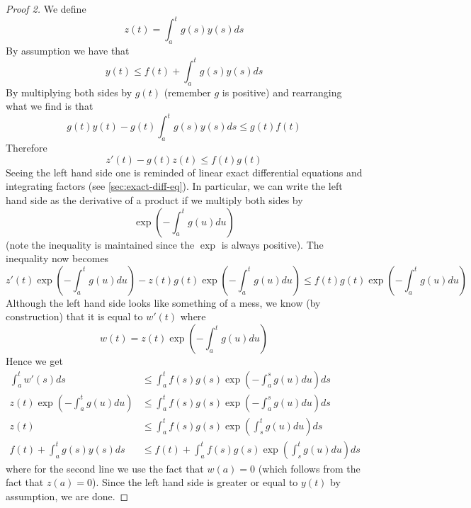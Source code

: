 \begin{proof}[Proof 2]
    We define
    $$ z(t) = \int_a^t g(s) y(s) ds $$
    By assumption we have that
    $$ y(t) \leq f(t) + \int_a^t g(s) y(s) ds $$
    By multiplying both sides by $g(t)$ (remember $g$ is positive) and rearranging what we find is that
    $$ g(t) y(t) -  g(t) \int_a^t g(s) y(s) ds \leq g(t) f(t) $$
    Therefore
    $$ z'(t) - g(t) z(t) \leq f(t) g(t) $$
    Seeing the left hand side one is reminded of linear exact differential equations and integrating factors (see \autoref{sec:exact-diff-eq}). In particular, we can write the left hand side as the derivative of a product if we multiply both sides by
    $$ \exp \left(- \int_a^t g(u) du \right) $$
    (note the inequality is maintained since the $\exp$ is always positive). The inequality now becomes
    $$ z'(t) \exp \left(- \int_a^t g(u) du \right) - z(t) g(t) \exp \left(- \int_a^t g(u) du \right) \leq f(t) g(t) \exp \left(- \int_a^t g(u) du \right) $$
    Although the left hand side looks like something of a mess, we know (by construction) that it is equal to $w'(t)$ where
    $$w(t) = z(t) \exp \left(- \int_a^t g(u) du \right)$$
    Hence we get
    \begin{align*}
        \int_a^t w'(s) ds &\leq \int_a^t f(s) g(s) \exp \left( - \int_a^{s} g(u) du \right) ds\\
        z(t) \exp \left(- \int_a^t g(u) du \right) &\leq \int_a^t f(s) g(s) \exp \left( - \int_a^{s} g(u) du \right) ds\\
        z(t) &\leq \int_a^t f(s)g(s) \exp \left( \int_s^{t} g(u) du \right) ds\\
        f(t) + \int_a^t g(s) y(s) ds &\leq f(t) + \int_a^t f(s)g(s) \exp \left( \int_s^{t} g(u) du \right) ds
    \end{align*}
    where for the second line we use the fact that $w(a) = 0$ (which follows from the fact that $z(a) = 0$).
    Since the left hand side is greater or equal to $y(t)$ by assumption, we are done.
\end{proof}

